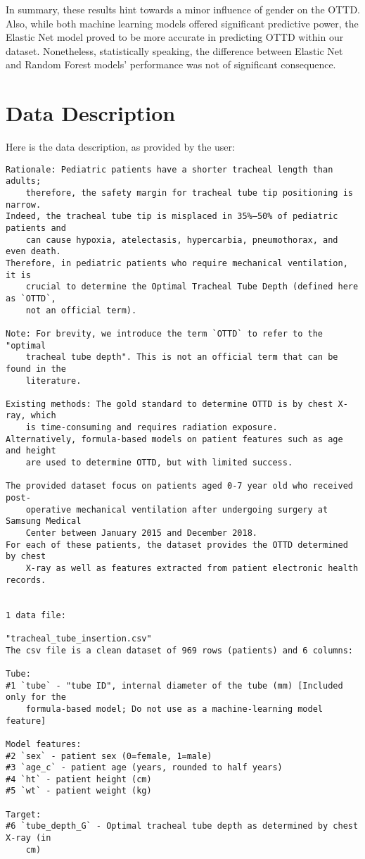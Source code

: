 \documentclass[11pt]{article}
\begin{document}
In summary, these results hint towards a minor influence of gender on the OTTD. Also, while both machine learning models offered significant predictive power, the Elastic Net model proved to be more accurate in predicting OTTD within our dataset. Nonetheless, statistically speaking, the difference between Elastic Net and Random Forest models' performance was not of significant consequence.


\clearpage
\appendix

\section{Data Description} \label{sec:data_description} Here is the data description, as provided by the user:

\begin{Verbatim}[tabsize=4]
Rationale: Pediatric patients have a shorter tracheal length than adults;
	therefore, the safety margin for tracheal tube tip positioning is narrow.
Indeed, the tracheal tube tip is misplaced in 35%–50% of pediatric patients and
	can cause hypoxia, atelectasis, hypercarbia, pneumothorax, and even death.
Therefore, in pediatric patients who require mechanical ventilation, it is
	crucial to determine the Optimal Tracheal Tube Depth (defined here as `OTTD`,
	not an official term).

Note: For brevity, we introduce the term `OTTD` to refer to the "optimal
	tracheal tube depth". This is not an official term that can be found in the
	literature.

Existing methods: The gold standard to determine OTTD is by chest X-ray, which
	is time-consuming and requires radiation exposure.
Alternatively, formula-based models on patient features such as age and height
	are used to determine OTTD, but with limited success.

The provided dataset focus on patients aged 0-7 year old who received post-
	operative mechanical ventilation after undergoing surgery at Samsung Medical
	Center between January 2015 and December 2018.
For each of these patients, the dataset provides the OTTD determined by chest
	X-ray as well as features extracted from patient electronic health records.


1 data file:

"tracheal_tube_insertion.csv"
The csv file is a clean dataset of 969 rows (patients) and 6 columns:

Tube:
#1 `tube` - "tube ID", internal diameter of the tube (mm) [Included only for the
	formula-based model; Do not use as a machine-learning model feature]

Model features:
#2 `sex` - patient sex (0=female, 1=male)
#3 `age_c` - patient age (years, rounded to half years)
#4 `ht` - patient height (cm)
#5 `wt` - patient weight (kg)

Target:
#6 `tube_depth_G` - Optimal tracheal tube depth as determined by chest X-ray (in
	cm)



\end{Verbatim}
\end{document}

